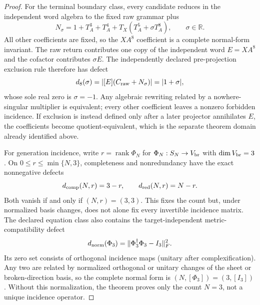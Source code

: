 \begin{proof}
For the terminal boundary class, every candidate reduces in the independent word algebra to the fixed raw grammar plus
\begin{equation}
 N_\sigma
 =1+T_A^3+T_A^4+T_X(T_A^5+\sigma T_A^8),
 \qquad \sigma\in\mathbb R.
\end{equation}
All other coefficients are fixed, so the $XA^8$ coefficient is a complete normal-form invariant.  The raw return contributes one copy of the independent word $E=XA^8$ and the cofactor contributes $\sigma E$.  The independently declared pre-projection exclusion rule therefore has defect
\begin{equation}
 d_8(\sigma)=\left|[E](C_{\rm raw}+N_\sigma)\right|
 =|1+\sigma|,
\end{equation}
whose sole real zero is $\sigma=-1$.  Any algebraic rewriting related by a nowhere-singular multiplier is equivalent; every other coefficient leaves a nonzero forbidden incidence.  If exclusion is instead defined only after a later projector annihilates $E$, the coefficients become quotient-equivalent, which is the separate theorem domain already identified above.

For generation incidence, write $r=\operatorname{rank}\Phi_N$ for $\Phi_N:S_N\to V_{\rm br}$ with $\dim V_{\rm br}=3$.  On $0\le r\le\min\{N,3\}$, completeness and nonredundancy have the exact
nonnegative defects
\begin{equation}
 d_{\rm comp}(N,r)=3-r,
 \qquad
 d_{\rm red}(N,r)=N-r.
\end{equation}
Both vanish if and only if $(N,r)=(3,3)$.  This fixes the count but, under normalized basis changes, does not alone fix every invertible incidence matrix.  The declared equation class also contains the target-independent metric-compatibility defect
\begin{equation}
 d_{\rm norm}(\Phi_3)
 =\|\Phi_3^\dagger\Phi_3-I_3\|_F^2.
\end{equation}
Its zero set consists of orthogonal incidence maps (unitary after complexification).  Any two are related by normalized orthogonal or unitary changes of the sheet or broken-direction basis, so the
complete normal form is $(N,[\Phi_3])=(3,[I_3])$.  Without this normalization, the theorem proves only the count $N=3$, not a unique incidence operator.


\end{proof}
